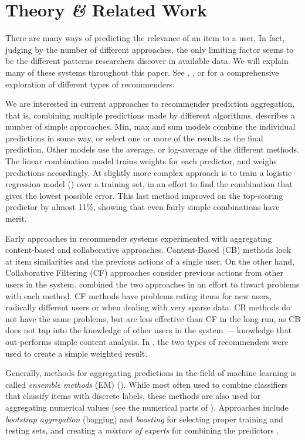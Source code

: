 \section{Theory \emph{\&} Related Work}

There are many ways of predicting the
relevance of an item to a user. 
In fact, judging by the number of different approaches,
the only limiting factor seems to be the different 
patterns researchers discover in available data.
We will explain many of these systems throughout this paper.
See 
\cite{Adomavicius2005}, \cite{Pazzani2007}, \cite{Schafer2007} 
or \cite{Bjorkoy2010d} for a comprehensive exploration 
of different types of recommenders.

We are interested in current approaches to recommender prediction aggregation,
that is, combining multiple predictions made by different algorithms.
\cite{Aslam2001} describes a number of simple approaches.
Min, max and sum models combine the individual predictions in some way, 
or select one or more of the results as the final prediction. 
Other models use the average, or log-average of the different methods.
The linear combination model trains weights for each predictor, and weighs predictions accordingly.
At slightly more complex approach is to train a logistic regression model (\cite[p3]{Aslam2001})
over a training set, in an effort to find the combination that gives the lowest possible error.
This last method improved on the top-scoring predictor by almost 11\%,
showing that even fairly simple combinations have merit.

Early approaches in recommender systems experimented with aggregating content-based and collaborative approaches.
Content-Based (CB) methods look at item similarities and the previous actions of a single user.
On the other hand, Collaborative Filtering (CF) approaches consider
previous actions from other users in the system.
\cite{Claypool1999} combined the two approaches in an effort to thwart problems with each method.
CF methods have problems rating items for new users, radically different users or when dealing with very sparse data.
CB methods do not have the same problems, but are less effective than CF in the long run, as CB does not tap into the 
knowledge of other users in the system --- knowledge that out-performs simple content analysis.
In \cite{Claypool1999}, the two types of recommenders were used to create a simple weighted result.

Generally, methods for aggregating predictions in the field of machine learning is called \emph{ensemble methods} (EM) (\cite{Dietterich2000}).
While most often used to combine classifiers that classify items with discrete labels,
these methods are also used for aggregating numerical values (see the numerical parts of \cite{Breiman1996}).
Approaches include \emph{bootstrap aggregation} (bagging) and \emph{boosting} 
for selecting proper training and testing sets,
and creating a \emph{mixture of experts} for combining the predictors
\cite[p27]{Polikar2006}.

